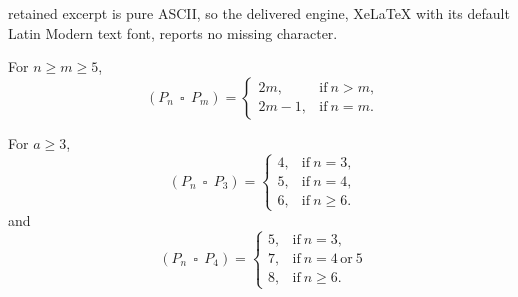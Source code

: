 \documentclass[10pt,a4paper]{amsart}
\DeclareMathOperator{\cp}{\,\square\,}
\DeclareMathOperator{\mobmv}{Mob_{\mu}}
\begin{document}
retained excerpt is pure ASCII, so the delivered engine, XeLaTeX with its default Latin Modern text font, reports no missing character.
	\begin{theorem}
		For $n \geq m \geq 5$, \[\mobmv(P_n \cp P_m) =
		\begin{cases}
			2m, & \text{if}\ n > m, \\
			2m-1, & \text{if}\ n = m.
		\end{cases}
		\]
		\label{largecartgrids}
	\end{theorem}

	\begin{theorem}
		For $a \geq 3$,		 
		\[\mobmv(P_n \cp P_3) =
		\begin{cases}
			4, & \text{if}\ n = 3, \\
			5, & \text{if}\ n = 4, \\
			6, & \text{if}\ n \geq 6.
		\end{cases} \] and \[ \mobmv(P_n \cp P_4) =
		\begin{cases}
			5, & \text{if}\ n = 3, \\
			7, & \text{if}\ n = 4 \,\text{or}\ 5 \\
			8, & \text{if}\ n \geq 6.
		\end{cases}
		\]
		\label{smallcartgrids}
	\end{theorem}
\end{document}

